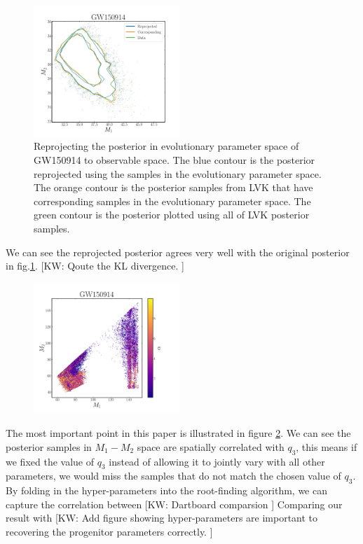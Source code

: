 \documentclass[twocolumn]{aastex631}
\newcommand{\kw}[1]{{\color{rb4}[KW: #1 ]}}
\begin{document}
\begin{figure}
\includegraphics[width=0.49\textwidth]{static/GW150914_reprojection.pdf}
\caption{Reprojecting the posterior in evolutionary parameter space of GW150914 to observable space.
The blue contour is the posterior reprojected using the samples in the evolutionary parameter space.
The orange contour is the posterior samples from LVK that have corresponding samples in the evolutionary parameter space.
The green contour is the posterior plotted using all of LVK posterior samples.
}
\label{fig:GW150914_reprojection}
\end{figure}

We can see the reprojected posterior agrees very well with the original posterior in fig.\ref{fig:GW150914_reprojection}.
\kw{Qoute the KL divergence.}



\begin{figure}
\includegraphics[width=0.49\textwidth]{static/GW150914_m1m2alpha.png}
\caption{}
\label{fig:GW150914_M1_M2_q3}
\end{figure}


The most important point in this paper is illustrated in figure \ref{fig:GW150914_M1_M2_q3}.
We can see the posterior samples in $M_1-M_2$ space are spatially correlated with $q_3$,
this means if we fixed the value of $q_3$ instead of allowing it to jointly vary with all other parameters,
we would miss the samples that do not match the chosen value of $q_3$.
By folding in the hyper-parameters into the root-finding algorithm,
we can capture the correlation between 
\kw{Dartboard comparsion} Comparing our result with 
\kw{Add figure showing hyper-parameters are important to recovering the progenitor parameters correctly.}
\end{document}
